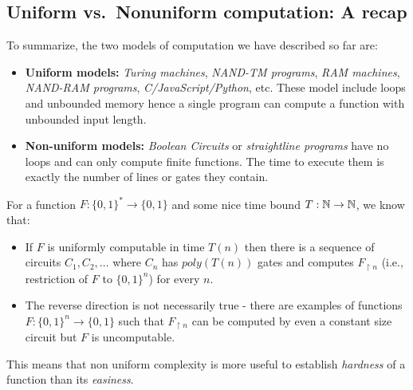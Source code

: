 \subsection{Uniform vs.~Nonuniform computation: A
recap}\label{Uniform-vsNonuniform-comp}

To summarize, the two models of computation we have described so far
are:

\begin{itemize}
\item
  \textbf{Uniform models:} \emph{Turing machines}, \emph{NAND-TM
  programs}, \emph{RAM machines}, \emph{NAND-RAM programs},
  \emph{C/JavaScript/Python}, etc. These model include loops and
  unbounded memory hence a single program can compute a function with
  unbounded input length.
\item
  \textbf{Non-uniform models:} \emph{Boolean Circuits} or
  \emph{straightline programs} have no loops and can only compute finite
  functions. The time to execute them is exactly the number of lines or
  gates they contain.
\end{itemize}

For a function \(F:\{0,1\}^* \rightarrow \{0,1\}\) and some nice time
bound \(T:{\mathbb{N}} \rightarrow {\mathbb{N}}\), we know that:

\begin{itemize}
\item
  If \(F\) is uniformly computable in time \(T(n)\) then there is a
  sequence of circuits \(C_1,C_2,\ldots\) where \(C_n\) has
  \(poly(T(n))\) gates and computes \(F_{\upharpoonright n}\) (i.e.,
  restriction of \(F\) to \(\{0,1\}^n\)) for every \(n\).
\item
  The reverse direction is not necessarily true - there are examples of
  functions \(F:\{0,1\}^n \rightarrow \{0,1\}\) such that
  \(F_{\upharpoonright n}\) can be computed by even a constant size
  circuit but \(F\) is uncomputable.
\end{itemize}

This means that non uniform complexity is more useful to establish
\emph{hardness} of a function than its \emph{easiness}.


